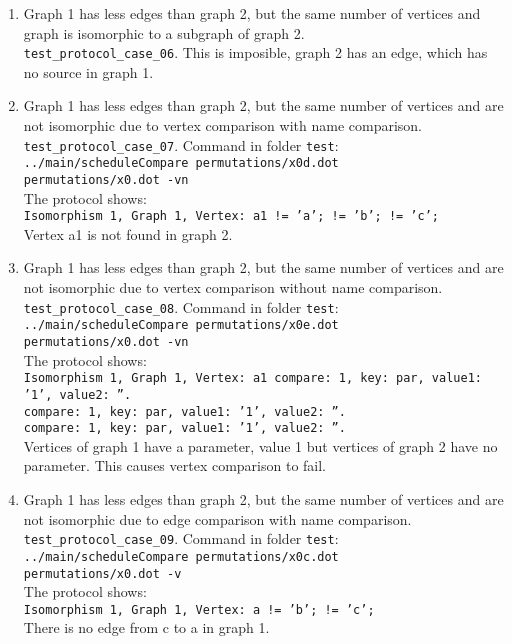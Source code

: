 \documentclass[12pt,a4paper]{report}
\begin{document}
\begin{enumerate}
  \item Graph 1 has less edges than graph 2, but the same number of vertices and graph is isomorphic to a subgraph of graph 2. \\
    \texttt{test\_protocol\_case\_06}. This is imposible, graph 2 has an edge, which has no source in graph 1.
  \item Graph 1 has less edges than graph 2, but the same number of vertices and are not isomorphic due to vertex comparison with name comparison.
    \texttt{test\_protocol\_case\_07}. Command in folder \texttt{test}: \\
    \texttt{../main/scheduleCompare permutations/x0d.dot \\ permutations/x0.dot -vn} \\
    The protocol shows: \\
    \texttt{Isomorphism 1, Graph 1, Vertex: a1 != 'a'; != 'b'; != 'c';} \\
    Vertex a1 is not found in graph 2.
  \item Graph 1 has less edges than graph 2, but the same number of vertices and are not isomorphic due to vertex comparison without name comparison.
    \texttt{test\_protocol\_case\_08}. Command in folder \texttt{test}: \\
    \texttt{../main/scheduleCompare permutations/x0e.dot \\ permutations/x0.dot -vn} \\
    The protocol shows: \\
    \texttt{Isomorphism 1, Graph 1, Vertex: a1 compare: 1, key: par, value1: '1', value2: ''. \\
    compare: 1, key: par, value1: '1', value2: ''. \\
    compare: 1, key: par, value1: '1', value2: ''.} \\
    Vertices of graph 1 have a parameter, value 1 but vertices of graph 2 have no parameter. This causes vertex comparison to fail.
  \item Graph 1 has less edges than graph 2, but the same number of vertices and are not isomorphic due to edge comparison with name comparison.
    \texttt{test\_protocol\_case\_09}. Command in folder \texttt{test}: \\
    \texttt{../main/scheduleCompare permutations/x0c.dot \\ permutations/x0.dot -v} \\
    The protocol shows: \\
    \texttt{Isomorphism 1, Graph 1, Vertex: a != 'b'; != 'c';} \\
    There is no edge from c to a in graph 1. 


\end{enumerate}
\end{document}
